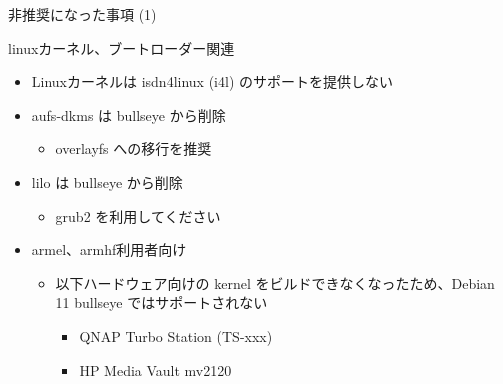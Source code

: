 \begin{frame}{非推奨になった事項 (1)}%

linuxカーネル、ブートローダー関連
  
\begin{itemize}
\item Linuxカーネルは isdn4linux (i4l) のサポートを提供しない
\item aufs-dkms は bullseye から削除
  \begin{itemize}
  \item overlayfs への移行を推奨
  \end{itemize}    
\item lilo は bullseye から削除
  \begin{itemize}
  \item grub2 を利用してください
  \end{itemize}    
\item armel、armhf利用者向け
  \begin{itemize}
  \item 以下ハードウェア向けの kernel をビルドできなくなったため、Debian 11 bullseye ではサポートされない
    \begin{itemize}
    \item QNAP Turbo Station (TS-xxx)
    \item HP Media Vault mv2120 
    \end{itemize}
  \end{itemize}  
\end{itemize}

\end{frame}


